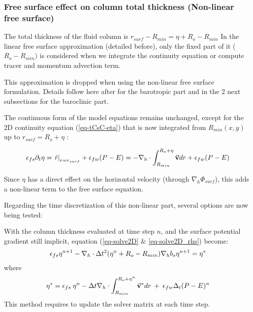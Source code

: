 \subsubsection{Free surface effect on column total thickness
(Non-linear free surface)}

The total thickness of the fluid column is
$r_{surf} - R_{min} = \eta + R_o - R_{min}$
In the linear free surface approximation
(detailed before), only the fixed part of
it ($R_o - R_{min})$ is considered when we integrate the 
continuity equation or compute tracer and momentum advection term.

This approximation is dropped when using 
the non-linear free surface formulation. 
Details follow here after for the barotropic part
and in the 2 next subsections for the baroclinic
part.


The continuous form of the model equations remains 
unchanged, except for the 2D continuity equation
(\ref{eq-tCsC-eta}) that is now integrated 
from $R_{min}(x,y)$ up to $r_{surf}=R_o+\eta$ :

\begin{displaymath}
\epsilon_{fs} \partial_t \eta =
\left. \dot{r} \right|_{r=r_{surf}} + \epsilon_{fw} (P-E) =
- {\bf \nabla}_h \cdot \int_{R_{min}}^{R_o+\eta} \vec{\bf v} dr
+ \epsilon_{fw} (P-E)
\end{displaymath}

Since $\eta$ has a direct effect on the horizontal
velocity (through $\nabla_h \Phi_{surf}$), this
adds a non-linear term to the free surface equation.

Regarding the time discretization of this non-linear part,
several options are now being tested:

With the column thickness evaluated at time step $n$,
and the surface potential gradient still implicit,
equation (\ref{eq-solve2D} \& \ref{eq-solve2D_rhs})
become:
\begin{eqnarray*}
\epsilon_{fs} {\eta}^{n+1} -
{\bf \nabla}_h \cdot \Delta t^2 (\eta^{n}+R_o-R_{min})
{\bf \nabla}_h b_s {\eta}^{n+1}
= {\eta}^*
\end{eqnarray*}
where
\begin{eqnarray*}
{\eta}^* = \epsilon_{fs} \: {\eta}^{n} -
\Delta t {\bf \nabla}_h \cdot \int_{R_{min}}^{R_o+\eta^n} \vec{\bf v}^* dr
\: + \: \epsilon_{fw} \Delta_t (P-E)^{n}
\end{eqnarray*} 
This method requires to update the solver matrix at each time step.

